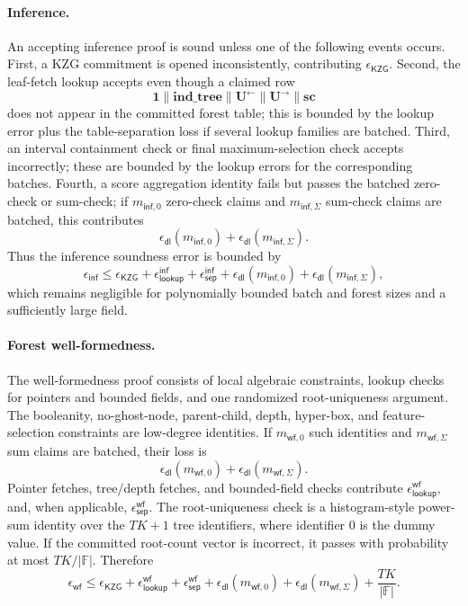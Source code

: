 \paragraph{Inference.}
An accepting inference proof is sound unless one of the following events occurs.
First, a KZG commitment is opened inconsistently, contributing
$\epsilon_{\mathsf{KZG}}$.  Second, the leaf-fetch lookup accepts even though a
claimed row
\[
  \mathbf{1}\|\mathbf{ind\_tree}\|\mathbf{U}^{\leftarrow}\|
  \mathbf{U}^{\rightarrow}\|\mathbf{sc}
\]
does not appear in the committed forest table; this is bounded by the lookup
error plus the table-separation loss if several lookup families are batched.
Third, an interval containment check or final maximum-selection check accepts
incorrectly; these are bounded by the lookup errors for the corresponding
batches.  Fourth, a score aggregation identity fails but passes the batched
zero-check or sum-check; if $m_{\mathsf{inf},0}$ zero-check claims and
$m_{\mathsf{inf},\Sigma}$ sum-check claims are batched, this contributes
\[
    \epsilon_{\mathsf{dl}}(m_{\mathsf{inf},0})
    +
    \epsilon_{\mathsf{dl}}(m_{\mathsf{inf},\Sigma}).
\]
Thus the inference soundness error is bounded by
\[
\epsilon_{\mathsf{inf}}
\leq
\epsilon_{\mathsf{KZG}}
+\epsilon_{\mathsf{lookup}}^{\mathsf{inf}}
+\epsilon_{\mathsf{sep}}^{\mathsf{inf}}
+\epsilon_{\mathsf{dl}}(m_{\mathsf{inf},0})
+\epsilon_{\mathsf{dl}}(m_{\mathsf{inf},\Sigma}),
\]
which remains negligible for polynomially bounded batch and forest sizes and a sufficiently large field.

\paragraph{Forest well-formedness.}
The well-formedness proof consists of local algebraic constraints, lookup
checks for pointers and bounded fields, and one randomized root-uniqueness
argument.  The booleanity, no-ghost-node, parent-child, depth, hyper-box, and
feature-selection constraints are low-degree identities.  If
$m_{\mathsf{wf},0}$ such identities and $m_{\mathsf{wf},\Sigma}$ sum claims are
batched, their loss is
\[
    \epsilon_{\mathsf{dl}}(m_{\mathsf{wf},0})
    +
    \epsilon_{\mathsf{dl}}(m_{\mathsf{wf},\Sigma}).
\]
Pointer fetches, tree/depth fetches, and bounded-field checks contribute
$\epsilon_{\mathsf{lookup}}^{\mathsf{wf}}$,
and, when applicable, $\epsilon_{\mathsf{sep}}^{\mathsf{wf}}$.  The
root-uniqueness check is a histogram-style power-sum identity over the $TK+1$
tree identifiers, where identifier $0$ is the dummy value.  If the committed
root-count vector is incorrect, it passes with probability at most
$TK/|\mathbb{F}|$.  Therefore
\[
\epsilon_{\mathsf{wf}}
\leq
\epsilon_{\mathsf{KZG}}
+\epsilon_{\mathsf{lookup}}^{\mathsf{wf}}
+\epsilon_{\mathsf{sep}}^{\mathsf{wf}}
+\epsilon_{\mathsf{dl}}(m_{\mathsf{wf},0})
+\epsilon_{\mathsf{dl}}(m_{\mathsf{wf},\Sigma})
+\frac{TK}{|\mathbb{F}|}.
\]


